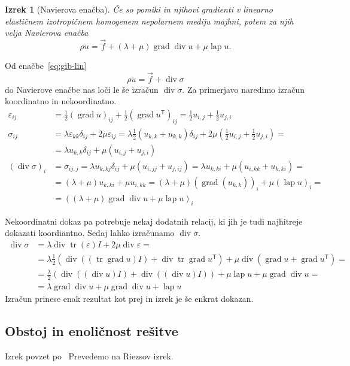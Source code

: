 \documentclass[12pt,a4paper]{article}
\theoremstyle{definition} %
\theoremstyle{plain} %
\newtheorem{izrek}[definicija]{Izrek}
\numberwithin{equation}{section}
\newcommand{\T}{\mathsf{T}}
\newcommand{\lap}{\operatorname{lap}}
\renewcommand{\div}{\operatorname{div}}
\newcommand{\grad}{\operatorname{grad}}
\newcommand{\eps}{\varepsilon}
\newcommand{\vf}{\vec{f}}
\newcommand{\ts}{\sigma}
\DeclareMathOperator{\tr}{tr}
\begin{document}
\begin{izrek}[Navierova enačba]
  Če so pomiki in njihovi gradienti v linearno elastičnem izotropičnem homogenem
  nepolarnem mediju majhni, potem za njih velja \emph{Navierova enačba}
  \begin{equation}
    \rho \ddot{u} = \vf + (\lambda + \mu)\grad\div u + \mu \lap u.
    \label{eq:navier}
  \end{equation}
\end{izrek}
\proof
Od enačbe~\eqref{eq:gib-lin}
\[
  \rho \ddot{u} = \vf + \div \ts
\]
do Navierove enačbe nas loči le še izračun $\div \sigma$. Za primerjavo naredimo
izračun koordinatno in nekoordinatno.
\begin{align*}
  \eps_{ij} &= \frac12 (\grad u)_{ij} + \frac12 (\grad u^\T)_{ij} =
  \frac12 u_{i,j} + \frac12 u_{j,i} \\
  \ts_{ij} &= \lambda \eps_{kk} \delta_{ij} + 2 \mu \eps_{ij} =
  \lambda \frac{1}{2} (u_{k,k} + u_{k,k}) \delta_{ij} + 2 \mu( \frac12 u_{i,j} +
  \frac12 u_{j,i}) =  \\ &= \lambda u_{k, k}\delta_{ij} + \mu (u_{i,j} +u_{j,i})
  \\
  (\div \ts)_i &= \sigma_{ij,j} = \lambda u_{k, kj}\delta_{ij} + \mu (u_{i,jj}
+u_{j,ij}) = \lambda u_{k,ki} + \mu (u_{i,kk} + u_{k,ki}) = \\
&= (\lambda + \mu)u_{k,ki} + \mu u_{i,kk} = (\lambda+\mu)(\grad(u_{k,k}))_i +
\mu (\lap u)_i = \\ &=
((\lambda + \mu)\grad\div u + \mu \lap u)_i
\end{align*}

Nekoordinatni dokaz pa potrebuje nekaj dodatnih relacij, ki jih je tudi
najhitreje dokazati koordiantno.
Sedaj lahko izračunamo $\div\ts$.
\begin{align*}
  \div\ts &= \lambda \div \tr(\eps) I + 2\mu \div \eps = \\ &=
  \lambda \frac12(\div((\tr\grad u)I) + \div\tr\grad u^\T) + \mu \div(\grad u + \grad
  u^\T) = \\
  &= \frac{\lambda}{2} (\div((\div u) I) + \div( (\div u)I)) + \mu \lap u + \mu
  \grad \div u = \\
  &= \lambda \grad \div u + \mu \grad \div u + \lap u
\end{align*}
Izračun prinese enak rezultat kot prej in izrek je še enkrat dokazan.
\endproof

\subsection{Obstoj in enoličnost rešitve}
Izrek povzet po~\cite[izrek 3.15.1, str.\ 226]{lebedev2009introduction}
Prevedemo na Riezsov izrek.
\end{document}
